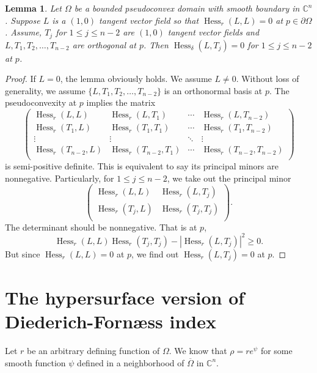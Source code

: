 \documentclass[11pt]{article}
\theoremstyle{plain} \numberwithin{equation}{section}
\newtheorem{lemma}[theorem]{Lemma}
\theoremstyle{definition}
\DeclareMathOperator{\Hessian}{Hess}
\begin{document}
 \begin{lemma}\label{basic2}
 	Let $\Omega$ be a bounded pseudoconvex domain with smooth boundary in $\mathbb{C}^n$. Suppose $L$ is a $(1,0)$ tangent vector field so that $\Hessian_r(L, L)=0$ at $p\in \partial\Omega$. Assume, $T_j$ for $1\leq j\leq n-2$ are $(1,0)$ tangent vector fields and $L, T_1, T_2, \dots, T_{n-2}$ are orthogonal at $p$. Then $\Hessian_\delta (L, T_j)=0$ for $1\leq j\leq n-2$ at $p$.
 \end{lemma}

\begin{proof}
	If $L=0$, the lemma obviously holds. We assume $L\neq 0$. Without loss of generality, we assume $\lbrace L, T_1, T_2, \dots, T_{n-2}\rbrace$ is an orthonormal basis at $p$. The pseudoconvexity at $p$ implies the matrix \[\begin{pmatrix}
	\Hessian_r(L, L)& \Hessian_r(L, T_1)&\cdots&\Hessian_r (L, T_{n-2})\\
	\Hessian_r(T_1, L)& \Hessian_r(T_1, T_1)&\cdots&\Hessian_r (T_1, T_{n-2})\\
	\vdots&\vdots&\ddots&\vdots\\
\Hessian_r(T_{n-2}, L)& \Hessian_r(T_{n-2}, T_1)&\cdots&\Hessian_r (T_{n-2}, T_{n-2})\\
	\end{pmatrix}\] is semi-positive definite. This is equivalent to say its principal minors are nonnegative. Particularly, for $1\leq j\leq n-2$, we take out the principal minor
	\[\begin{pmatrix}
	\Hessian_r(L, L)&\Hessian_r(L, T_j)\\
		\Hessian_r(T_j, L)&\Hessian_r(T_j, T_j)\\
	\end{pmatrix}.\] The determinant should be nonnegative. That is at $p$, \[\Hessian_r(L, L)\Hessian_r(T_j, T_j)-|\Hessian_r(L, T_j)|^2\geq 0.\] But since $\Hessian_r(L, L)=0$ at $p$, we find out $\Hessian_r(L, T_j)=0$ at $p$.
\end{proof}





	\section{The hypersurface version of Diederich-Forn\ae ss index}\label{sec2}
	
	Let $r$ be an arbitrary defining function of $\Omega$. We know that $\rho=re^\psi$ for some smooth function $\psi$ defined in a neighborhood of $\overline{\Omega}$ in $\mathbb{C}^n$. 
	
\end{document}
